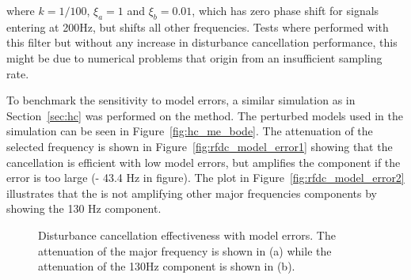where $k=1/100$, $\xi_a=1$ and $\xi_b=0.01$, which has zero phase shift for signals entering at 200Hz, but shifts all other frequencies. Tests where performed with this filter but without any increase in disturbance cancellation performance, this might be due to numerical problems that origin from an insufficient sampling rate.

To benchmark the sensitivity to model errors, a similar simulation as in Section~\ref{sec:hc} was performed on the \abbrRFDC method. The perturbed models used in the simulation can be seen in Figure~\ref{fig:hc_me_bode}. The attenuation of the selected frequency is shown in Figure~\ref{fig:rfdc_model_error1} showing that the cancellation is efficient with low model errors, but amplifies the component if the error is too large (\abbrRFDC - 43.4 Hz in figure). The plot in Figure~\ref{fig:rfdc_model_error2} illustrates that the \abbrRFDC is not amplifying other major frequencies components by showing the 130 Hz component.

\begin{figure}[h!]
  \centering %
  \qquad
  \caption{\label{fig:rfdc_model_error} Disturbance cancellation effectiveness with model errors. The attenuation of the major frequency is shown in (a) while the attenuation of the 130Hz component is shown in (b).}
\end{figure}


